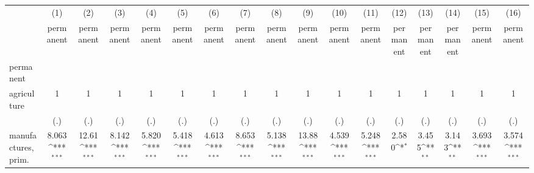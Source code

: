 {
\def\sym#1{\ifmmode^{#1}\else\(^{#1}\)\fi}
\begin{tabular}{l*{16}{c}}
\hline\hline
                    &\multicolumn{1}{c}{(1)}&\multicolumn{1}{c}{(2)}&\multicolumn{1}{c}{(3)}&\multicolumn{1}{c}{(4)}&\multicolumn{1}{c}{(5)}&\multicolumn{1}{c}{(6)}&\multicolumn{1}{c}{(7)}&\multicolumn{1}{c}{(8)}&\multicolumn{1}{c}{(9)}&\multicolumn{1}{c}{(10)}&\multicolumn{1}{c}{(11)}&\multicolumn{1}{c}{(12)}&\multicolumn{1}{c}{(13)}&\multicolumn{1}{c}{(14)}&\multicolumn{1}{c}{(15)}&\multicolumn{1}{c}{(16)}\\
                    &\multicolumn{1}{c}{permanent}&\multicolumn{1}{c}{permanent}&\multicolumn{1}{c}{permanent}&\multicolumn{1}{c}{permanent}&\multicolumn{1}{c}{permanent}&\multicolumn{1}{c}{permanent}&\multicolumn{1}{c}{permanent}&\multicolumn{1}{c}{permanent}&\multicolumn{1}{c}{permanent}&\multicolumn{1}{c}{permanent}&\multicolumn{1}{c}{permanent}&\multicolumn{1}{c}{permanent}&\multicolumn{1}{c}{permanent}&\multicolumn{1}{c}{permanent}&\multicolumn{1}{c}{permanent}&\multicolumn{1}{c}{permanent}\\
\hline
permanent           &                     &                     &                     &                     &                     &                     &                     &                     &                     &                     &                     &                     &                     &                     &                     &                     \\
agriculture         &           1         &           1         &           1         &           1         &           1         &           1         &           1         &           1         &           1         &           1         &           1         &           1         &           1         &           1         &           1         &           1         \\
                    &         (.)         &         (.)         &         (.)         &         (.)         &         (.)         &         (.)         &         (.)         &         (.)         &         (.)         &         (.)         &         (.)         &         (.)         &         (.)         &         (.)         &         (.)         &         (.)         \\
[1em]
manufactures, prim. &       8.063\sym{***}&       12.61\sym{***}&       8.142\sym{***}&       5.820\sym{***}&       5.418\sym{***}&       4.613\sym{***}&       8.653\sym{***}&       5.138\sym{***}&       13.88\sym{***}&       4.539\sym{***}&       5.248\sym{***}&       2.580\sym{*}  &       3.455\sym{**} &       3.143\sym{**} &       3.693\sym{***}&       3.574\sym{***}\\

\end{tabular}}
